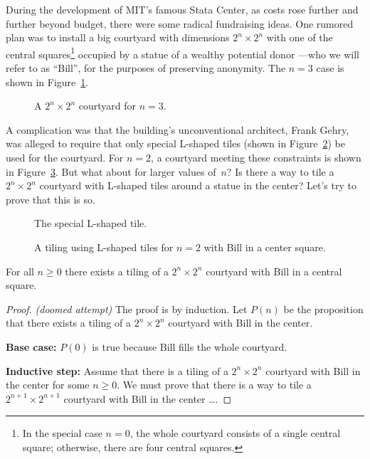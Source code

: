 During the development of MIT's famous Stata Center, as costs rose
further and further beyond budget, there were some radical fundraising
ideas.  One rumored plan was to install a big courtyard with
dimensions $2^n \times 2^n$ with one of the central
squares\footnote{In the special case $n = 0$, the whole courtyard
consists of a single central square; otherwise, there are four central
squares.} occupied by a statue of a wealthy potential donor ---who we
will refer to as ``Bill'', for the purposes of preserving anonymity.
The $n = 3$ case is shown in Figure~\ref{fig:2nx2n-tile}.

\begin{figure}


\caption{A $2^n \times 2^n$ courtyard for $n = 3$.}
\label{fig:2nx2n-tile}
\end{figure}


A complication was that the building's unconventional architect, Frank
Gehry, was alleged to require that only special L-shaped tiles (shown
in Figure~\ref{fig:Ltile}) be used for the courtyard.  For $n = 2$, a
courtyard meeting these constraints is shown in
Figure~\ref{fig:2Ltile}.  But what about for larger values of~$n$?  Is
there a way to tile a $2^n \times 2^n$ courtyard with L-shaped tiles
around a statue in the center?  Let's try to prove that this is so.

\begin{figure}


\caption{The special L-shaped tile.}
\label{fig:Ltile}
\end{figure}

\begin{figure}


\caption{A tiling using L-shaped tiles for $n = 2$ with Bill in a
  center square.}
\label{fig:2Ltile}
\end{figure}

\begin{theorem}\label{bill}
For all $n \geq 0$ there exists a tiling of a $2^n \times 2^n$
courtyard with Bill in a central square.
\end{theorem}

\begin{proof}
\emph{(doomed attempt)} The proof is by induction.  Let $P(n)$ be the
proposition that there exists a tiling of a $2^n \times 2^n$ courtyard
with Bill in the center.

\textbf{Base case:} $P(0)$ is true because Bill fills the whole courtyard.

\textbf{Inductive step:} Assume that there is a tiling of a
$2^n \times 2^n$ courtyard with Bill in the center for some $n \geq
0$.  We must prove that there is a way to tile a $2^{n+1} \times
2^{n+1}$ courtyard with Bill in the center \dots.
\end{proof}

